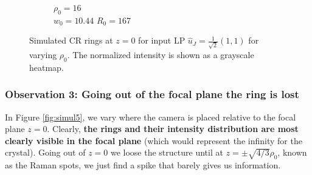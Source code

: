 \documentclass[11pt, a4paper, twoside]{article} %
\begin{document}
\begin{figure}[h!]
\begin{subfigure}[b]{0.245\linewidth}
    \caption{$\rho_0=16$\\ $w_0=10.44$ $R_0=167$}
     \end{subfigure}
    \caption{Simulated CR rings at $z=0$ for input LP $\hat{u}_J=\frac{1}{\sqrt{2}}(1,1)$ for varying $\rho_0$. The normalized intensity is shown as a grayscale heatmap.}
            \label{fig:simul4}
\end{figure}


\subsubsection*{Observation 3: Going out of the focal plane the ring is lost}
In Figure \ref{fig:simul5}, we vary where the camera is placed relative to the focal plane $z=0$. Clearly, {\bf the rings and their intensity distribution are most clearly visible in the focal plane} (which would represent the infinity for the crystal). Going out of $z=0$ we loose the structure until at $z=\pm\sqrt{4/3}\rho_0$, known as the Raman spots, we just find a spike that barely gives us information.
\end{document}
